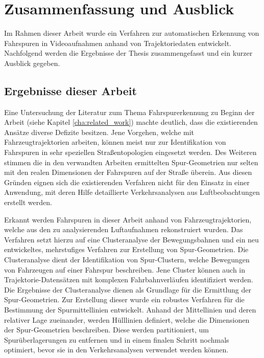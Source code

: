 
\chapter{Zusammenfassung und Ausblick}
\label{cha:end}

Im Rahmen dieser Arbeit wurde ein Verfahren zur automatischen Erkennung von Fahrspuren in Videoaufnahmen
anhand von Trajektoriedaten entwickelt.
Nachfolgend werden die Ergebnisse der Thesis zusammengefasst und ein kurzer Ausblick gegeben.

\section{Ergebnisse dieser Arbeit}

Eine Untersuchung der Literatur zum Thema Fahrspurerkennung zu Beginn der Arbeit
(siehe Kapitel \ref{cha:related_work}) machte deutlich, dass die existierenden Ansätze diverse
Defizite besitzen.
Jene Vorgehen, welche mit Fahrzeugtrajektorien arbeiten, können meist nur zur Identifikation von Fahrspuren
in sehr speziellen Straßentopologien eingesetzt werden.
Des Weiteren stimmen die in den verwandten Arbeiten ermittelten Spur-Geometrien nur selten mit den realen Dimensionen
der Fahrspuren auf der Straße überein.
Aus diesen Gründen eignen sich die existierenden Verfahren nicht für den Einsatz in einer
Anwendung, mit deren Hilfe detaillierte Verkehrsanalysen aus Luftbeobachtungen erstellt werden.

Erkannt werden Fahrspuren in dieser Arbeit anhand von Fahrzeugtrajektorien, welche aus den zu analysierenden
Luftaufnahmen rekonstruiert wurden. Das Verfahren setzt hierzu auf eine Clusteranalyse der Bewegungsbahnen
und ein neu entwickeltes, mehrstufiges Verfahren zur Erstellung von Spur-Geometrien.
Die Clusteranalyse dient der Identifikation von Spur-Clustern, welche Bewegungen von Fahrzeugen auf einer Fahrspur beschreiben.
Jene Cluster können auch in Trajektorie-Datensätzen mit komplexen Fahrbahnverläufen identifiziert werden.
Die Ergebnisse der Clusteranalyse dienen als Grundlage für die Ermittlung der Spur-Geometrien.
Zur Erstellung dieser wurde ein robustes Verfahren für die Bestimmung der Spurmittellinien entwickelt.
Anhand der Mittellinien und deren relativer Lage zueinander, werden Hülllinien definiert,
welche die Dimensionen der Spur-Geometrien beschreiben. Diese werden partitioniert,
um Spurüberlagerungen zu entfernen und in einem finalen Schritt nochmals optimiert,
bevor sie in den Verkehrsanalysen verwendet werden können.

